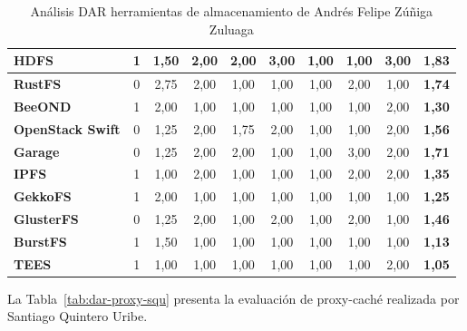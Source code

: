 \begin{table}[H]
\begin{tabular}{|>{\raggedright\arraybackslash\bfseries}p{2.7cm}|c|c|c|c|c|c|c|c|c|}
HDFS & 1 & 1,50 & 2,00 & 2,00 & 3,00 & 1,00 & 1,00 & 3,00 & \textbf{1,83} \\ \hline
\rowcolor{gridrow} RustFS & 0 & 2,75 & 2,00 & 1,00 & 1,00 & 1,00 & 2,00 & 1,00 & \textbf{1,74} \\ \hline
BeeOND & 1 & 2,00 & 1,00 & 1,00 & 1,00 & 1,00 & 1,00 & 2,00 & \textbf{1,30} \\ \hline
\rowcolor{gridrow} OpenStack Swift & 0 & 1,25 & 2,00 & 1,75 & 2,00 & 1,00 & 1,00 & 2,00 & \textbf{1,56} \\ \hline
Garage & 0 & 1,25 & 2,00 & 2,00 & 1,00 & 1,00 & 3,00 & 2,00 & \textbf{1,71} \\ \hline
\rowcolor{gridrow} IPFS & 1 & 1,00 & 2,00 & 1,00 & 1,00 & 1,00 & 2,00 & 2,00 & \textbf{1,35} \\ \hline
GekkoFS & 1 & 2,00 & 1,00 & 1,00 & 1,00 & 1,00 & 1,00 & 1,00 & \textbf{1,25} \\ \hline
\rowcolor{gridrow} GlusterFS & 0 & 1,25 & 2,00 & 1,00 & 2,00 & 1,00 & 2,00 & 1,00 & \textbf{1,46} \\ \hline
BurstFS & 1 & 1,50 & 1,00 & 1,00 & 1,00 & 1,00 & 1,00 & 1,00 & \textbf{1,13} \\ \hline
\rowcolor{gridrow} TEES & 1 & 1,00 & 1,00 & 1,00 & 1,00 & 1,00 & 1,00 & 2,00 & \textbf{1,05} \\ \hline
\end{tabular}
\caption{Análisis DAR herramientas de almacenamiento de Andrés Felipe Zúñiga Zuluaga}
\label{tab:dar-almac-azz}
\end{table}

La Tabla~\ref{tab:dar-proxy-squ} presenta la evaluación de proxy-caché realizada por Santiago
Quintero Uribe.

